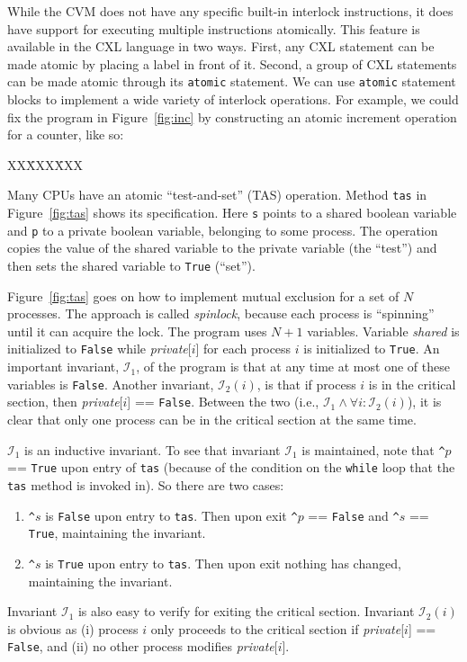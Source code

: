 \documentclass{report}
\newcommand{\cxlsource}[1]{
\begin{tabbing}
XX\=XXX\=XXX\kill
    
\end{tabbing}
}
\newenvironment{code}{
\tcolorbox
}{
\endtcolorbox
}
\begin{document}

While the CVM does not have any specific built-in interlock instructions,
it does have support for executing multiple instructions atomically.
This feature is available in the CXL language in two ways.
First, any CXL statement can be made atomic by placing a label in front
of it.  Second, a group of CXL statements can be made atomic
through its \texttt{atomic}
statement.
We can use \texttt{atomic} statement blocks to implement a wide variety of
interlock operations.
For example, we could fix the program in Figure~\ref{fig:inc} by
constructing an atomic increment operation for a counter, like so:
\begin{code}
\cxlsource{atomicinc}
\end{code}

Many CPUs have an atomic ``test-and-set'' (TAS)
operation.
Method \texttt{tas} in Figure~\ref{fig:tas} shows its specification.
Here \texttt{s} points to a shared boolean variable and \texttt{p}
to a private boolean variable, belonging to some process.
The operation copies the value of the shared variable to the
private variable (the ``test'')
and then sets the shared variable to \texttt{True} (``set'').

Figure~\ref{fig:tas} goes on how to implement mutual exclusion for
a set of $N$ processes.
The approach is called \emph{spinlock},
because each process is ``spinning'' until
it can acquire the lock.
The program uses $N+1$ variables.
Variable \textit{shared} is initialized to \texttt{False} while
\textit{private}[$i$] for each process $i$ is initialized to \texttt{True}.
An important invariant, $\mathcal{I}_1$, of the program is that at any time at most
one of these variables is \texttt{False}.
Another invariant, $\mathcal{I}_2(i)$, is that if process $i$ is in the critical section,
then \textit{private}[$i$] == \texttt{False}.
Between the two (i.e., $\mathcal{I}_1 \land \forall i: \mathcal{I}_2(i)$),
it is clear that only one process can be in the
critical section at the same time.

$\mathcal{I}_1$ is an inductive invariant.
To see that invariant $\mathcal{I}_1$ is maintained, note that
\texttt{\^{}}$p$ == \texttt{True} upon entry of \texttt{tas}
(because of the condition on the \texttt{while} loop that the
\texttt{tas} method is invoked in).
So there are two cases:
\begin{enumerate}
\item \texttt{\^{}}$s$ is \texttt{False} upon entry to \texttt{tas}.
Then upon exit \texttt{\^{}}$p$ == \texttt{False} and \texttt{\^{}}$s$ == \texttt{True},
maintaining the invariant.
\item \texttt{\^{}}$s$ is \texttt{True} upon entry to \texttt{tas}.
Then upon exit nothing has changed, maintaining the invariant.
\end{enumerate}
Invariant $\mathcal{I}_1$ is also easy to verify for exiting the critical section.
Invariant $\mathcal{I}_2(i)$ is obvious as (i) process $i$ only proceeds to the critical
section if \textit{private}[$i$] == \texttt{False}, and (ii) no other process modifies
\textit{private}[$i$].
\end{document}

